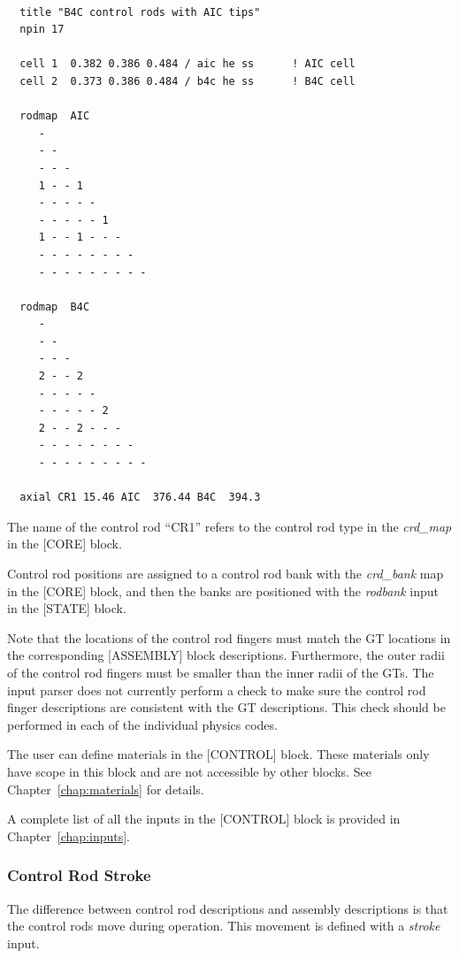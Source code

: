 \begin{Verbatim}[fontsize=\small]

  title "B4C control rods with AIC tips"
  npin 17

  cell 1  0.382 0.386 0.484 / aic he ss      ! AIC cell
  cell 2  0.373 0.386 0.484 / b4c he ss      ! B4C cell

  rodmap  AIC
     -
     - -
     - - -
     1 - - 1
     - - - - -
     - - - - - 1
     1 - - 1 - - -
     - - - - - - - -
     - - - - - - - - -

  rodmap  B4C
     -
     - -
     - - -
     2 - - 2
     - - - - -
     - - - - - 2
     2 - - 2 - - -
     - - - - - - - -
     - - - - - - - - -

  axial CR1 15.46 AIC  376.44 B4C  394.3

\end{Verbatim}

The name of the control rod ``CR1'' refers to the control rod type in the
{\it crd\_map} in the [CORE] block.

Control rod positions are assigned to a control rod bank with the {\it crd\_bank} map
in the [CORE] block, and then the banks are positioned with the
{\it rodbank} input in the [STATE] block.

Note that the locations of the control rod fingers must match the GT locations in the
corresponding [ASSEMBLY] block descriptions.  Furthermore, the outer radii of the control
rod fingers must be smaller than the inner radii of the GTs.
The input parser does not currently perform a check to make sure the control rod finger
descriptions are consistent with the GT descriptions.
This check should be performed in each of the individual physics codes.

The user can define materials in the [CONTROL] block.  These materials only have scope in
this block and are not accessible by other blocks. See Chapter~\ref{chap:materials} for details.

A complete list of all the inputs in the [CONTROL] block is provided in Chapter~\ref{chap:inputs}.

\subsubsection{Control Rod Stroke}
\label{sec:stroke}

The difference between control rod descriptions and assembly descriptions is that
the control rods move during operation. This movement is defined with a {\it stroke} input.

